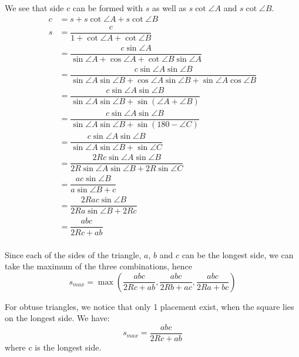 \documentclass[12pt]{scrartcl}
\begin{document}
We see that side c can be formed with \(s\) as well as \(s \cot \angle A\) and \(s \cot \angle B\).
\begin{equation}
\begin{split}
		c             & = s+s\cot \angle A+s\cot \angle B                                                                           \\
		s             & = \dfrac{c}{1+\cot \angle A+\cot \angle B}                                                                             \\
		              & = \dfrac{c \sin\angle A}{\sin\angle A+\cos\angle A+\cot\angle B\sin\angle A}                                        \\
		              & = \dfrac{c\sin\angle A\sin\angle B}{\sin\angle A\sin\angle B+\cos\angle A\sin\angle B+\sin\angle A\cos\angle B} \\
		              & = \dfrac{c\sin\angle A\sin\angle B}{\sin\angle A\sin\angle B+\sin\left(\angle A+\angle B\right)}                    \\
		              & = \dfrac{c\sin\angle A\sin\angle B}{\sin\angle A\sin\angle B+\sin\left(180-\angle C\right)}                         \\
		              & = \dfrac{c\sin\angle A\sin\angle B}{\sin\angle A\sin\angle B+\sin \angle C}                                         \\
		              & = \dfrac{2Rc\sin\angle A\sin\angle B}{2R\sin\angle A\sin \angle B+2R\sin \angle C}                                   \\
		              & = \dfrac{ac\sin\angle B}{a\sin\angle B+c}                                                                             \\
		              & = \dfrac{2Rac\sin\angle B}{2Ra\sin\angle B+2Rc}                                                                       \\
		              & = \dfrac{abc}{2Rc+ab}                                                                                                   \\
\end{split}
\end{equation}

Since each of the sides of the triangle, $a$, $b$ and $c$ can be the longest side, 
we can take the maximum of the three combinations, hence
\begin{equation}
s_{max} = \max\left(\dfrac{abc}{2Rc+ab},\dfrac{abc}{2Rb+ac},\dfrac{abc}{2Ra+bc}\right)
\end{equation}

For obtuse triangles, we notice that only 1 placement exist, when the square lies on the longest side. We have: 
\begin{equation}
s_{max} = \dfrac{abc}{2Rc+ab}
\end{equation}
where c is the longest side.

\printbibliography
\end{document}
